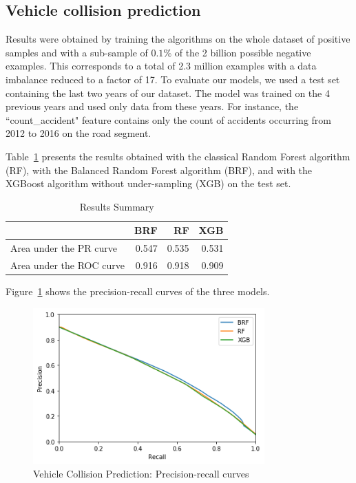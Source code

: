\documentclass[conference]{IEEEtran}
\begin{document}
\subsection{Vehicle collision prediction}

Results were obtained by training the algorithms on the whole
dataset of positive samples and with a sub-sample of $0.1\%$ of the 2
billion possible negative examples. This corresponds to a total of 2.3
million examples with a data imbalance reduced to a factor of 17. To
evaluate our models, we used a test set containing the last two years of our
dataset. The model was trained on the 4 previous years and used only data
from these years. For instance, the ``count\_accident" feature contains only
the count of accidents occurring from 2012 to 2016 on the road segment.

Table~\ref{table:summary} presents the results obtained with the classical
Random Forest algorithm (RF), with the Balanced Random Forest algorithm (BRF), and with the XGBoost algorithm without under-sampling (XGB) on the test set.

\begin{table}[htbp]
\caption{Results Summary}
\begin{center}
\begin{tabular}{|l|r|r|r|}
\hline
                 &    BRF &    RF &    XGB \\
\hline
Area under the PR curve &  0.547 &  0.535 &  0.531 \\
Area under the ROC curve &  0.916 &  0.918 &  0.909 \\
\hline
\end{tabular}
\label{table:summary}
\end{center}
\end{table}

Figure~\ref{fig:precision-recall} shows the precision-recall curves of the three models.

\begin{figure}[htbp]
\centerline{\includegraphics[height=6cm, keepaspectratio]{figures/pr.png}}
\caption{Vehicle Collision Prediction: Precision-recall curves}
\label{fig:precision-recall}
\end{figure}
\end{document}
